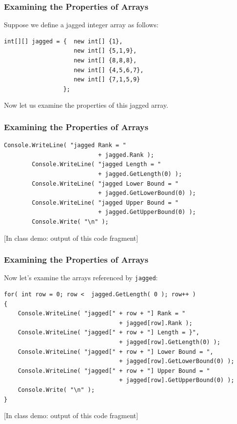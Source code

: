 \begin{frame}[fragile]
\frametitle{Examining the Properties of Arrays}

Suppose we define a jagged integer array as follows:
\begin{verbatim}
int[][] jagged = { 	new int[] {1}, 
                    new int[] {5,1,9}, 
                    new int[] {8,8,8}, 
                    new int[] {4,5,6,7}, 
                    new int[] {7,1,5,9} 
                 };
\end{verbatim}

Now let us examine the properties of this jagged array.

\end{frame}


\begin{frame}[fragile]
\frametitle{Examining the Properties of Arrays}

\begin{verbatim}
Console.WriteLine( "jagged Rank = " 
                           + jagged.Rank );
		Console.WriteLine( "jagged Length = " 
		                   + jagged.GetLength(0) );
		Console.WriteLine( "jagged Lower Bound = " 
		                   + jagged.GetLowerBound(0) );
		Console.WriteLine( "jagged Upper Bound = " 
		                   + jagged.GetUpperBound(0) );
		Console.Write( "\n" );

\end{verbatim}

[In class demo: output of this code fragment]

\end{frame}


\begin{frame}[fragile]
\frametitle{Examining the Properties of Arrays}

Now let's examine the arrays referenced by \texttt{jagged}:

{\scriptsize
\begin{verbatim}
for( int row = 0; row <  jagged.GetLength( 0 ); row++ )
{
    Console.WriteLine( "jagged[" + row + "] Rank = "
                                 + jagged[row].Rank );
    Console.WriteLine( "jagged[" + row + "] Length = }",
                                 + jagged[row].GetLength(0) );
    Console.WriteLine( "jagged[" + row + "] Lower Bound = ",
                                 + jagged[row].GetLowerBound(0) );
    Console.WriteLine( "jagged[" + row + "] Upper Bound = "
                                 + jagged[row].GetUpperBound(0) );
    Console.Write( "\n" );
}
\end{verbatim}
}
[In class demo: output of this code fragment]

\end{frame}

